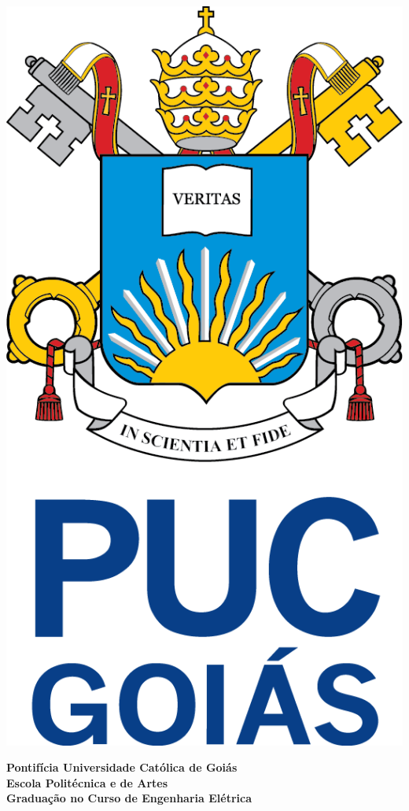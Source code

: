 \documentclass[a4paper, 12pt]{article}
\begin{document}
\thispagestyle{empty}

\begin{center} %
\includegraphics[scale=0.3]{PUCLOGO.png}

\large
\textbf{Pontifícia Universidade Católica de Goiás}\\
\textbf{Escola Politécnica e de Artes}\\
\textbf{Graduação no Curso de Engenharia Elétrica}\\
\vspace{3cm}



\end{center}
\end{document}
